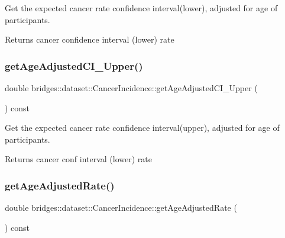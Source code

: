 Get the expected cancer rate confidence interval(lower), adjusted for age of participants.

\begin{DoxyReturn}{Returns}
cancer confidence interval (lower) rate 
\end{DoxyReturn}
\mbox{\label{classbridges_1_1dataset_1_1_cancer_incidence_aa4c0975807e67227388f23fbf92e0867}} 
\subsubsection{\texorpdfstring{get\+Age\+Adjusted\+C\+I\+\_\+\+Upper()}{getAgeAdjustedCI\_Upper()}}
{\footnotesize\ttfamily double bridges\+::dataset\+::\+Cancer\+Incidence\+::get\+Age\+Adjusted\+C\+I\+\_\+\+Upper (\begin{DoxyParamCaption}{ }\end{DoxyParamCaption}) const\hspace{0.3cm}{\ttfamily [inline]}}

Get the expected cancer rate confidence interval(upper), adjusted for age of participants.

\begin{DoxyReturn}{Returns}
cancer conf interval (lower) rate 
\end{DoxyReturn}
\mbox{\label{classbridges_1_1dataset_1_1_cancer_incidence_abb8b465d513b8e7113c0dda4f1381b36}} 
\subsubsection{\texorpdfstring{get\+Age\+Adjusted\+Rate()}{getAgeAdjustedRate()}}
{\footnotesize\ttfamily double bridges\+::dataset\+::\+Cancer\+Incidence\+::get\+Age\+Adjusted\+Rate (\begin{DoxyParamCaption}{ }\end{DoxyParamCaption}) const\hspace{0.3cm}{\ttfamily [inline]}}

